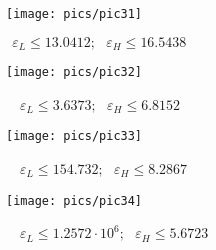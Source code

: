 \begin{figure}[H]
    \centering
    \caption{$~~\varepsilon_L\le13.0412;~~~\varepsilon_H\le16.5438$}
    \texttt{[image: pics/pic31]}
    \label{pic:31}
\end{figure}
\begin{figure}[H]
    \centering
    \caption{~~$\varepsilon_L\le3.6373;~~~\varepsilon_H\le6.8152$}
    \texttt{[image: pics/pic32]}
    \label{pic:32}
\end{figure}
\begin{figure}[H]
    \centering
    \caption{~~$\varepsilon_L\le154.732;~~~\varepsilon_H\le8.2867$}
    \texttt{[image: pics/pic33]}
    \label{pic:33}
\end{figure}
\begin{figure}[H]
    \centering
    \caption{~~$\varepsilon_L\le1.2572\cdot10^{6};~~~\varepsilon_H\le5.6723$}
    \texttt{[image: pics/pic34]}
    \label{pic:34}
\end{figure}
